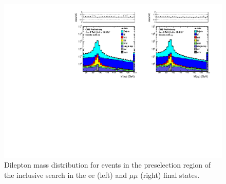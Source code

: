 \begin{figure}[hbt]
  \begin{center}
	\includegraphics[width=1.0\linewidth]{plots/dilmass_2jets_19fb.pdf}
	\caption{
	  \label{fig:dilmass_2j}\protect 
	  Dilepton mass distribution for events in the preselection region of the inclusive search
	  in the ee (left) and $\mu\mu$ (right) final states.}





  \end{center}
\end{figure}

